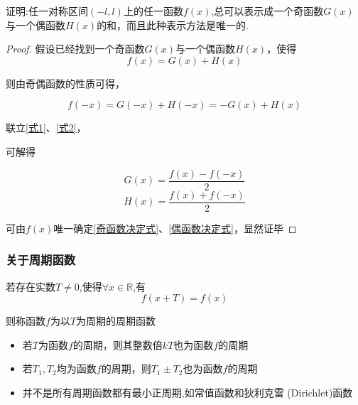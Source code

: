 \vspace{8pt}

\begin{example}
    证明:任一对称区间$(-l,l)$上的任一函数$f(x)$,总可以表示成一个奇函数$G(x)$与一个偶函数$H(x)$的和，而且此种表示方法是唯一的.
\end{example}

\begin{proof}

    假设已经找到一个奇函数$G(x)$与一个偶函数$H(x)$，使得
    \begin{equation}
        f(x)=G(x)+H(x) \label{式1}
    \end{equation}

    则由奇偶函数的性质可得，

    \begin{equation}
        f(-x)=G(-x)+H(-x)=-G(x)+H(x)    \label{式2}
    \end{equation}

    联立\ref{式1}、\ref{式2}，

    可解得

    \begin{equation}
        G(x) = \frac{f(x)-f(-x)}{2} \label{奇函数决定式}
    \end{equation}
    \begin{equation}
        H(x) = \frac{f(x)+f(-x)}{2} \label{偶函数决定式}
    \end{equation}

    可由$f(x)$唯一确定\ref{奇函数决定式}、\ref{偶函数决定式}，显然证毕
\end{proof}

\subsubsection{关于周期函数}
\begin{definition}[周期函数]
    若存在实数$T\ne 0$,使得$\forall x \in \mathbb{R} $,有
    \begin{equation*}
        f(x+T)=f(x)
    \end{equation*}

    则称函数$f$为以$T$为周期的周期函数
\end{definition}

\begin{note}
    \begin{itemize}
        \item 若$T$为函数$f$的周期，则其整数倍$kT$也为函数$f$的周期
        \item 若$T_1,T_2$均为函数$f$的周期，则$T_1\pm T_2$也为函数$f$的周期
        \item 并不是所有周期函数都有最小正周期,如常值函数和狄利克雷 (Dirichlet)函数
    \end{itemize}
\end{note}

